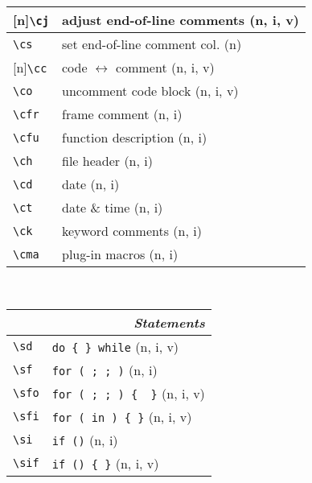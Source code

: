 \documentclass[oneside,10pt,landscape,DIV16]{scrartcl}
\newcommand{\Rep}{{\scriptsize{[n]}}}
\begin{document}
\begin{multicols}{3}
\begin{center}
\begin{tabular}[]{|p{11mm}|p{60mm}|}
\hline \Rep\verb'\cj'   & adjust end-of-line comments       \hfill (n, i, v)\\
\hline     \verb'\cs'   & set end-of-line comment col.      \hfill (n)      \\
%
\hline \Rep\verb'\cc'   & code $\leftrightarrow$ comment    \hfill (n, i, v)\\
\hline     \verb'\co'   & uncomment code block              \hfill (n, i, v)\\
%
\hline     \verb'\cfr'  & frame comment                     \hfill (n, i)   \\
\hline     \verb'\cfu'  & function description              \hfill (n, i)   \\
\hline     \verb'\ch'   & file header                       \hfill (n, i)   \\
\hline     \verb'\cd'   & date                              \hfill (n, i)   \\
\hline     \verb'\ct'   & date \& time                      \hfill (n, i)   \\
\hline     \verb'\ck'   & keyword comments                  \hfill (n, i)   \\
\hline     \verb'\cma'  & plug-in macros                    \hfill (n, i)   \\
\hline
\end{tabular}\\
%
%
\begin{tabular}[]{|p{11mm}|p{60mm}|}
\hline
\multicolumn{2}{|r|}{\textsl{\textbf{S}tatements}}                    \\[1.0ex]
\hline \verb'\sd'      & \verb'do { } while'          \hfill (n, i, v)\\
\hline \verb'\sf'      & \verb'for ( ; ; )'           \hfill (n, i)\\
\hline \verb'\sfo'     & \verb'for ( ; ; ) {  }'      \hfill (n, i, v)\\
\hline \verb'\sfi'     & \verb'for ( in ) { }'        \hfill (n, i, v)\\
\hline \verb'\si'      & \verb'if ()'                 \hfill (n, i)\\
\hline \verb'\sif'     & \verb'if () { }'             \hfill (n, i, v)\\

\end{tabular}
\end{center}
\end{multicols}
\end{document}
